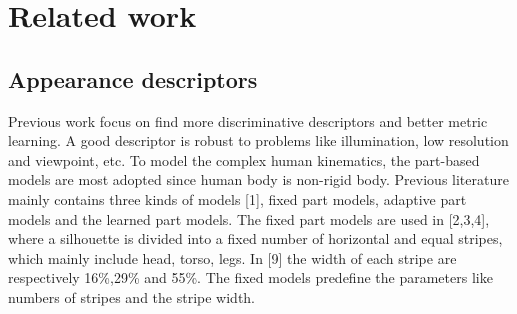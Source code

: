 \documentclass[conference,compsoc]{IEEEtran}
\begin{document}
%


\section{Related work}
\subsection{Appearance descriptors}
Previous work focus on find more discriminative descriptors and better metric learning. A good descriptor is robust to problems like illumination, low resolution and viewpoint, etc.
To model the complex human kinematics, the part-based models are most adopted since human body is non-rigid body. Previous literature mainly contains three kinds of models [1], fixed part models, adaptive part models and the learned part models. The fixed part models are used in [2,3,4], where a silhouette is divided into a fixed number of horizontal and equal stripes, which mainly include head, torso, legs. In [9] the width of each stripe are respectively 16\%,29\% and 55\%.  The fixed models predefine the parameters like numbers of stripes and the stripe width. 
\end{document}

